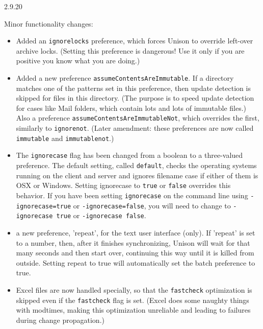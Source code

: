 \begin{changesfromversion}{2.9.20}
\item Minor functionality changes:
\begin{itemize}

\item Added an {\tt ignorelocks} preference, which forces Unison to override left-over
  archive locks.  (Setting this preference is dangerous!  Use it only if you
  are positive you know what you are doing.) 
\item Added a new preference {\tt assumeContentsAreImmutable}.  If a directory
  matches one of the patterns set in this preference, then update detection
  is skipped for files in this directory.  (The 
  purpose is to speed update detection for cases like Mail folders, which
  contain lots and lots of immutable files.)  Also a preference
  {\tt assumeContentsAreImmutableNot}, which overrides the first, similarly
  to {\tt ignorenot}.  (Later amendment: these preferences are now called
  {\tt immutable} and {\tt immutablenot}.)

\item The {\tt ignorecase} flag has been changed from a boolean to a three-valued
  preference.  The default setting, called {\tt default}, checks the operating systems
  running on the client and server and ignores filename case if either of them is
  OSX or Windows.  Setting ignorecase to {\tt true} or {\tt false} overrides
  this behavior.  If you have been setting {\tt ignorecase} on the command
  line using {\tt -ignorecase=true} or {\tt -ignorecase=false}, you will
  need to change to {\tt -ignorecase true} or {\tt -ignorecase false}.

\item a new preference, 'repeat', for the text user interface (only).  If 'repeat' is set to
  a number, then, after it finishes synchronizing, Unison will wait for that many seconds and
  then start over, continuing this way until it is killed from outside.  Setting repeat to true
  will automatically set the batch preference to true.  
  
\item Excel files are now handled specially, so that the {\tt fastcheck}
  optimization is skipped even if the {\tt fastcheck} flag is set.  (Excel
  does some naughty things with modtimes, making this optimization
  unreliable and leading to failures during change propagation.)


\end{itemize}
\end{changesfromversion}
